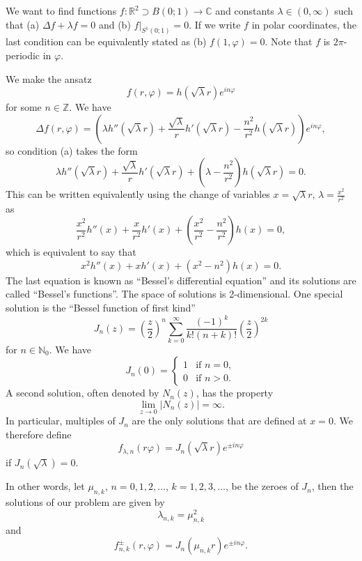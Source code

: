 \documentclass[12pt, oneside, a4paper]{article}
\theoremstyle{dfn}
\def\Nbb{\mathbb{N}}
\def\Rbb{\ensuremath{\mathbb{R}}}
\def\Zbb{\ensuremath{\mathbb{Z}}}
\newcommand{\Com}{\mathbb{C}}
\providecommand{\abs}[1]{\lvert#1\rvert}
\begin{document}




We want to find functions $f \colon \Rbb^2 \supset B(0;1) \to \Com$ and constants $\lambda \in (0,\infty)$ such that (a) $\Delta f + \lambda f = 0$ and (b) $f|_{S^1(0;1)} = 0$. If we write $f$ in polar coordinates, the last condition can be equivalently stated as (b) $f(1,\varphi) = 0$. Note that $f$ is $2\pi$-periodic in $\varphi$.

We make the ansatz
\[
f(r,\varphi) = h(\sqrt{\lambda}r) e^{in\varphi}
\]
for some $n \in \Zbb$. We have
\[
\Delta f(r,\varphi) = \left( \lambda h''(\sqrt{\lambda}r) + \frac{\sqrt{\lambda}}{r} h'(\sqrt{\lambda}r) - \frac{n^2}{r^2} h(\sqrt{\lambda}r) \right) e^{in\varphi},
\]
so condition (a) takes the form
\[
\lambda h''(\sqrt{\lambda}r) + \frac{\sqrt{\lambda}}{r} h'(\sqrt{\lambda}r) + \left(\lambda - \frac{n^2}{r^2} \right) h(\sqrt{\lambda}r) = 0.
\]
This can be written equivalently using the change of variables $x = \sqrt{\lambda} r$, $\lambda = \frac{x^2}{r^2}$ as
\[
\frac{x^2}{r^2} h''(x) + \frac{x}{r^2} h'(x) + \left( \frac{x^2}{r^2} - \frac{n^2}{r^2} \right) h(x) = 0,
\]
which is equivalent to say that
\[
x^2 h''(x) + xh'(x) + (x^2 - n^2)h(x) = 0.
\]
The last equation is known as ``Bessel's differential equation'' and its solutions are called ``Bessel's functions''. The space of solutions is 2-dimensional. One special solution is the ``Bessel function of first kind''
\[
J_n(z) = \left( \frac{z}{2} \right)^n \sum_{k=0}^\infty \frac{(-1)^k}{k! (n+k)!} \left( \frac{z}{2} \right)^{2k}
\]
for $n \in \Nbb_0$. We have
\[
J_n(0) = \begin{cases} 1 & \text{if $n=0,$} \\ 0 & \text{if $n>0.$} \end{cases}
\]
A second solution, often denoted by $N_n(z)$, has the property
\[
\lim_{z \to 0} \abs{N_n(z)} = \infty.
\]
In particular, multiples of $J_n$ are the only solutions that are defined at $x = 0$. We therefore define
\[
f_{\lambda,n}(r \varphi) = J_n(\sqrt{\lambda}r) e^{\pm in \varphi}
\]
if $J_n(\sqrt{\lambda}) = 0$.

In other words, let $\mu_{n,k}$, $n = 0,1,2, \dots$, $k = 1,2,3, \dots$, be the zeroes of $J_n$, then the solutions of our problem are given by
\[
\lambda_{n,k} = \mu^2_{n,k}
\]
and
\[
f^{\pm}_{n,k}(r,\varphi) = J_n(\mu_{n,k} r) e^{\pm in \varphi}.
\]
\end{document}
